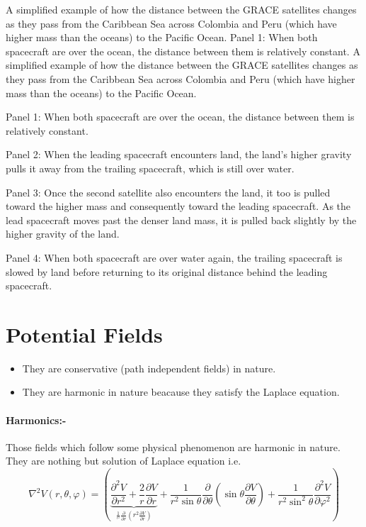 \documentclass[a4paper,12pt]{article}
\begin{document}

A simplified example of how the distance between the GRACE satellites changes as they pass from the Caribbean Sea across Colombia and Peru (which have higher mass than the oceans) to the Pacific Ocean. Panel 1: When both spacecraft are over the ocean, the distance between them is relatively constant. 
A simplified example of how the distance between the GRACE satellites changes as they pass from the Caribbean Sea across Colombia and Peru (which have higher mass than the oceans) to the Pacific Ocean.

Panel 1: When both spacecraft are over the ocean, the distance between them is relatively constant.

Panel 2: When the leading spacecraft encounters land, the land's higher gravity pulls it away from the trailing spacecraft, which is still over water.

Panel 3: Once the second satellite also encounters the land, it too is pulled toward the higher mass and consequently toward the leading spacecraft. As the lead spacecraft moves past the denser land mass, it is pulled back slightly by the higher gravity of the land.

Panel 4: When both spacecraft are over water again, the trailing spacecraft is slowed by land before returning to its original distance behind the leading spacecraft.





\newpage

\section{Potential Fields}
\begin{itemize}
\item They are conservative (path independent fields) in nature.     
\item They are harmonic in nature beacause they satisfy the Laplace equation.
\end{itemize}
\paragraph{Harmonics:-} Those fields which follow some physical phenomenon are harmonic in nature. They are nothing but solution of Laplace equation i.e.
\begin {equation}
\nabla ^2V(r,\theta ,\varphi) = \left( {\underbrace {\frac{\partial ^2V }{\partial r^2} +
\frac{2}{r}\frac{\partial V }{\partial
r}}_{\frac{1}{^{r^2}}\frac{\partial }{\partial r}\left( {r^2\frac{\partial
V }{\partial r}} \right)} + \frac{1}{r^2\sin \theta }\frac{\partial
}{\partial \theta }\left( {\sin \theta \frac{\partial V }{\partial \theta
}} \right) + \frac{1}{r^2\sin ^2\theta }\frac{\partial ^2V }{\partial
\varphi ^2}} \right)
\end{equation}
\end{document}
